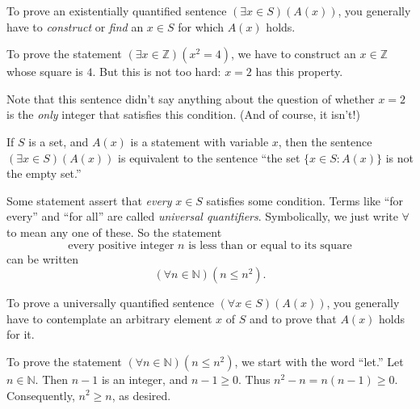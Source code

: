 \documentclass[11pt,dvipsnames]{book}
\numberwithin{figure}{section} %
\numberwithin{table}{section} %
\begin{document}
To prove an existentially quantified sentence $(\exists x\in S)(A(x))$, you generally have to \emph{construct} or \emph{find} an $x\in S$ for which $A(x)$ holds.
\begin{example}
    To prove the statement $(\exists x\in\mathbb{Z})(x^2=4)$, we have to construct an $x \in \mathbb{Z}
    $ whose square is $4$.
    But this is not too hard: $x = 2$ has this property.

    Note that this sentence didn't say anything about the question of whether $x=2$ is the \emph{only} integer that satisfies this condition.
    (And of course, it isn't!)
\end{example}

If $S$ is a set, and $A(x)$ is a statement with variable $x$, then the sentence $(\exists x \in S)(A(x))$ is equivalent to the sentence ``the set $\{x \in S : A(x)\}$ is not the empty set.''

Some statement assert that \emph{every} $x \in S$ satisfies some condition.
Terms like ``for every'' and ``for all'' are called \emph{universal quantifiers}.
Symbolically, we just write $\forall$ to mean any one of these.
So the statement
\[
\text{every positive integer $n$ is less than or equal to its square}
\]
can be written
\[
(\forall n\in\mathbb{N})(n\leq n^2).
\]

To prove a universally quantified sentence $(\forall x \in S)(A(x))$, you generally have to contemplate an arbitrary element $x$ of $S$ and to prove that $A(x)$ holds for it.
\begin{example}
    To prove the statement $(\forall n \in \mathbb{N})(n \leq n^2)$, we start with the word ``let.''
    Let $n \in \mathbb{N}$.
    Then $n-1$ is an integer, and $n-1\geq 0$.
    Thus $n^2-n = n(n-1) \geq 0$.
    Consequently, $n^2 \geq n$, as desired.
\end{example}
\end{document}
